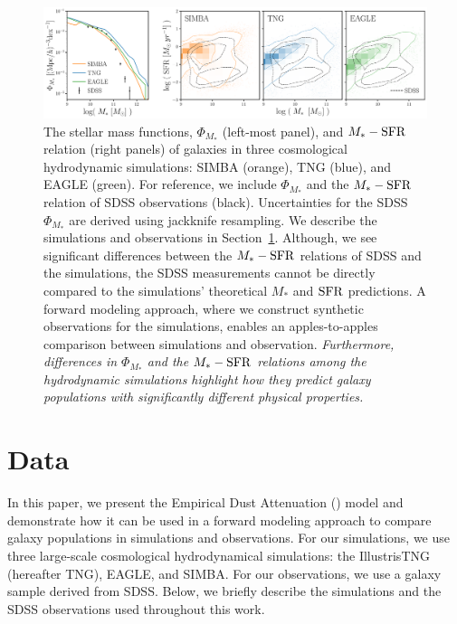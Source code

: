 \begin{figure}
\begin{center}
    \includegraphics[width=\textwidth]{figs/smf_m_sfr.pdf}
    \caption{\label{fig:smf_msfr}
    The stellar mass functions, $\Phi_{M_*}$ (left-most panel), and $M_*-{\rm SFR}$
    relation (right panels) of galaxies in three cosmological hydrodynamic 
    simulations: SIMBA (orange), TNG (blue), and EAGLE (green). 
    For reference, we include $\Phi_{M_*}$ and the $M_*-{\rm SFR}$ relation of
    SDSS observations (black).
    Uncertainties for the SDSS $\Phi_{M_*}$ are derived using jackknife
    resampling. 
    We describe the simulations and observations in Section~\ref{sec:sims}. 
    Although, we see significant differences between the $M_*-{\rm SFR}$ relations of
    SDSS and the simulations, the SDSS measurements cannot be directly compared
    to the simulations' theoretical $M_*$ and ${\rm SFR}$ predictions.
    A forward modeling approach, where we construct synthetic observations
    for the simulations, enables an apples-to-apples comparison between
    simulations and observation. 
    \emph{Furthermore, differences
    in $\Phi_{M_*}$ and the $M_*-{\rm SFR}$ relations among the hydrodynamic simulations 
    highlight how they predict galaxy populations with significantly different
    physical properties.} 
    }
\end{center}
\end{figure}

\section{Data}\label{sec:sims}
In this paper, we present the Empirical Dust Attenuation (\eda) model and
demonstrate how it can be used in a forward modeling approach to compare galaxy
populations in simulations and observations. For our simulations, we use three large-scale
cosmological hydrodynamical simulations: the IllustrisTNG (hereafter TNG),
EAGLE, and SIMBA. For our observations, we use a galaxy sample derived from
SDSS. Below, we briefly describe the simulations and the SDSS observations used
throughout this work.

